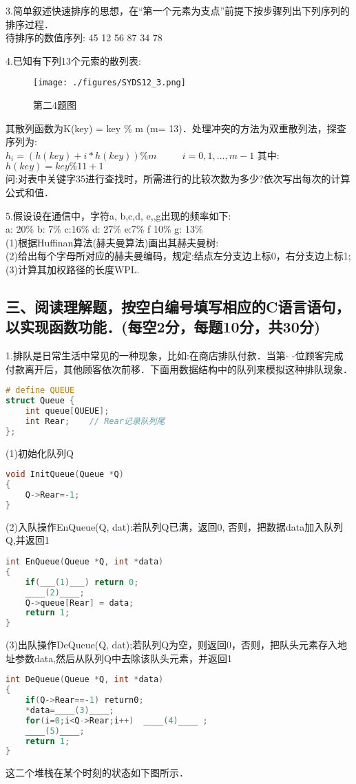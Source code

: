 3.简单叙述快速排序的思想，在“第一个元素为支点”前提下按步骤列出下列序列的排序过程． \\
待排序的数值序列: 45 12 56 87 34 78

4.已知有下列13个元索的散列表:
\begin{figure}[ht]
\centering
\texttt{[image: ./figures/SYDS12\_3.png]}
\caption{第二4题图} \label{SYDS12_fig3}
\end{figure}
其散列函数为K(key) = key \% m (m= 13)．处理冲突的方法为双重散列法，探查序列为:  \\
$h_i=(h(key)+i*h(key))\%m$ $\qquad$ $i=0,1,...,m-1$  其中: $h(key)=key\%11+1$ \\
问:对表中关键字35进行查找时，所需进行的比较次数为多少?依次写出每次的计算公式和值．

5.假设设在通信中，字符a, b,c,d, e,,g出现的频率如下: \\
a: 20\% b: 7\% c:16\% d: 27\% e:7\% f 10\% g: 13\% \\
(1)根据Huffinan算法(赫夫曼算法)画出其赫夫曼树: \\
(2)给出每个字母所对应的赫夫曼编码，规定:结点左分支边上标0，右分支边上标1; \\
(3)计算其加权路径的长度WPL.

\subsection{三、阅读理解题，按空白编号填写相应的C语言语句，以实现函数功能．(每空2分，每题10分，共30分)}

1.排队是日常生活中常见的一种现象，比如:在商店排队付款．当第- -位顾客完成付款离开后，其他顾客依次前移．下面用数据结构中的队列来模拟这种排队现象． \\
\begin{lstlisting}[language=cpp]
# define QUEUE
struct Queue {
    int queue[QUEUE];
    int Rear;    // Rear记录队列尾
};
\end{lstlisting}
(1)初始化队列Q
\begin{lstlisting}[language=cpp]
void InitQueue(Queue *Q)
{
    Q->Rear=-1;
}
\end{lstlisting}

(2)入队操作EnQueue(Q, dat):若队列Q已满，返回0, 否则，把数据data加入队列Q,并返回1
\begin{lstlisting}[language=cpp]
int EnQueue(Queue *Q, int *data)
{
    if(___(1)___) return 0;
    ____(2)____;
    Q->queue[Rear] = data;
    return 1;
}
\end{lstlisting}

(3)出队操作DeQueue(Q, dat);若队列Q为空，则返回0，否则，把队头元素存入地址参数data,然后从队列Q中去除该队头元素，并返回1
\begin{lstlisting}[language=cpp]
int DeQueue(Queue *Q, int *data)
{
    if(Q->Rear==-1) return0;
    *data=____(3)____;
    for(i=0;i<Q->Rear;i++)  ____(4)____ ;
    ____(5)____;
    return 1;
}
\end{lstlisting}
这二个堆栈在某个时刻的状态如下图所示．
